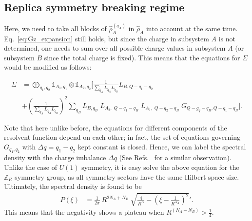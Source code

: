 \documentclass[aps,pra,reprint,superscriptaddress,twocolumn,notitlepage]{revtex4-1}
\numberwithin{equation}{section}
\begin{document}
\subsection{Replica symmetry breaking regime}
  Here, we need to take all blocks of $\hat\rho_{A}^{(q_A)}$ in $\hat\rho_{A}$ into account at the same time. Eq.~\eqref{eq:Gz_expansion} still holds, but since the charge in subsystem $A$ is not determined, one needs to sum over all possible charge values in subsystem $A$ (or subsystem $B$ since the total charge is fixed). This means that the equations for $\Sigma$ would be modified as follows:
\begin{widetext}
\begin{equation}
\begin{aligned}
    \Sigma &= \bigoplus_{q_1, q_2} \mathbb{1}_{A_1,q_1} \otimes \mathbb{1}_{A_2,q_2}  \bigg[ \frac{1}{\sum_{\tilde{q}_A} L_{\tilde{q}_A}  L_{\tilde{q}_B}  }    L_{B, Q - q_1 -q_2} \\
    &+ \left(\frac{1}{\sum_{\tilde{q}_A} L_{\tilde{q}_A}  L_{\tilde{q}_B} } \right)^2  \sum_{q_B} L_{B,q_B} \;
     L_{A_2, \; Q - q_1 - q_B } \; L_{A_1, \; Q -  q_2 - q_B } \; G_{Q - g_q - q_B , Q - q_1 -q_B }   \bigg].
\end{aligned}    
\end{equation}
\end{widetext}
Note that here unlike before, the equations for different components of the resolvent function depend on each other; in fact, the set of equations governing $G_{q_1,q_2}$ with $\Delta q = q_1 - q_2$ kept constant is closed. Hence, we can label the spectral density with the charge imbalance $\Delta q$ (See Refs.~\cite{Cornfeld2018, Murciano,Neven2021} for a similar observation). Unlike the case of $U(1)$ symmetry, it is easy solve the above equation for the $\mathbb{Z}_R$ symmetry group, as all symmetry sectors have the same Hilbert space size. Ultimately, the spectral density is found to be
\begin{equation}
\begin{aligned}
    P(\xi) &= \frac{1}{2\pi} \  R^{2N_A+N_B}  \  
    \sqrt{ \frac{4}{R^{N}} - \left( \xi - \frac{1}{R^{N_A}} \right)^2 }' .
\end{aligned}    
\end{equation}
This means that the negativity shows a plateau when $R^{\left( N_A - N_B \right)} > \frac14$. 
\end{document}
